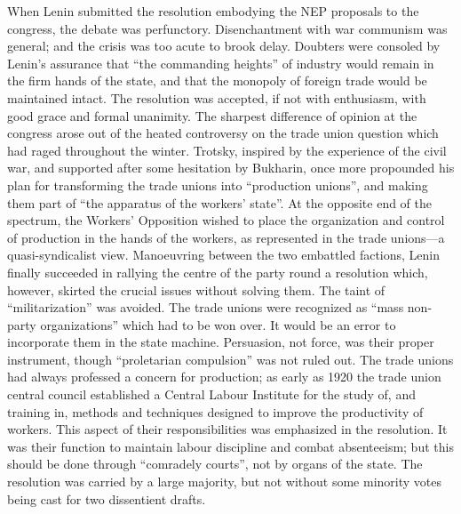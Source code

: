 When Lenin submitted the resolution embodying the NEP proposals to the congress, the debate was perfunctory. Disenchantment with war communism was general; and the crisis was too acute to brook delay. Doubters were consoled by Lenin's assurance that ``the commanding heights'' of industry would remain in the firm hands of the state, and that the monopoly of foreign trade would be maintained intact. The resolution was accepted, if not with enthusiasm, with good grace and formal unanimity. The sharpest difference of opinion at the congress arose out of the heated controversy on the trade union question which had raged throughout the winter. Trotsky, inspired by the experience of the civil war, and supported after some hesitation by Bukharin, once more propounded his plan for transforming the trade unions into ``production unions'', and making them part of ``the apparatus of the workers' state''. At the opposite end of the spectrum, the Workers' Opposition wished to place the organization and control of production in the hands of the workers, as represented in the trade unions---a quasi-syndicalist view. Manoeuvring between the two embattled factions, Lenin finally succeeded in rallying the centre of the party round a resolution which, however, skirted the crucial issues without solving them. The taint of ``militarization'' was avoided. The trade unions were recognized as ``mass non-party organizations'' which had to be won over. It would be an error to incorporate them in the state machine. Persuasion, not force, was their proper instrument, though ``proletarian compulsion'' was not ruled out. The trade unions had always professed a concern for production; as early as 1920 the trade union central council established a Central Labour Institute for the study of, and training in, methods and techniques designed to improve the productivity of workers. This aspect of their responsibilities was emphasized in the resolution. It was their function to maintain labour discipline and combat absenteeism; but this should be done through ``comradely courts'', not by organs of the state. The resolution was carried by a large majority, but not without some minority votes being cast for two dissentient drafts. 

